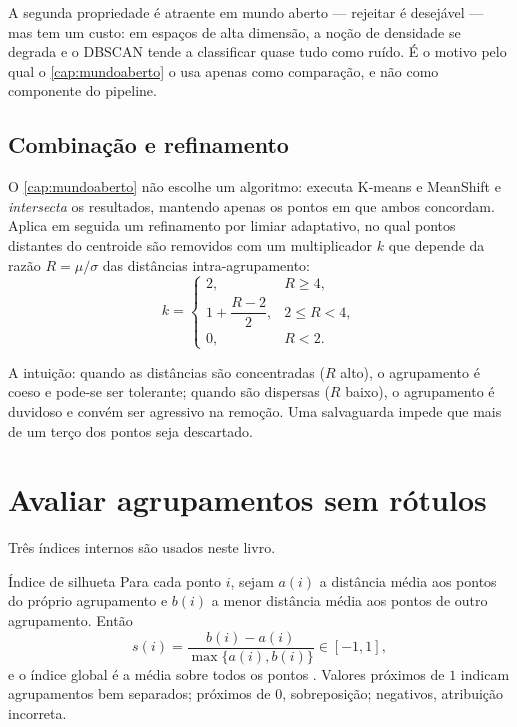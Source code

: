 A segunda propriedade é atraente em mundo aberto --- rejeitar é desejável --- mas tem um
custo: em espaços de alta dimensão, a noção de densidade se degrada e o DBSCAN tende a
classificar quase tudo como ruído. É o motivo pelo qual o \cref{cap:mundoaberto} o usa
apenas como comparação, e não como componente do pipeline.

\subsection{Combinação e refinamento}

O \cref{cap:mundoaberto} não escolhe um algoritmo: executa K-means e MeanShift e
\emph{intersecta} os resultados, mantendo apenas os pontos em que ambos concordam.
Aplica em seguida um refinamento por limiar adaptativo, no qual pontos distantes do
centroide são removidos com um multiplicador $k$ que depende da razão
$R = \mu/\sigma$ das distâncias intra-agrupamento:
\begin{equation}
  k = \begin{cases}
    2, & R \ge 4, \\
    1 + \dfrac{R - 2}{2}, & 2 \le R < 4, \\
    0, & R < 2.
  \end{cases}
  \label{eq:limiar-adaptativo}
\end{equation}

A intuição: quando as distâncias são concentradas ($R$ alto), o agrupamento é coeso e
pode-se ser tolerante; quando são dispersas ($R$ baixo), o agrupamento é duvidoso e
convém ser agressivo na remoção. Uma salvaguarda impede que mais de um terço dos pontos
seja descartado.

\section{Avaliar agrupamentos sem rótulos}

Três índices internos são usados neste livro.

\begin{definicao}{Índice de silhueta}
Para cada ponto $i$, sejam $a(i)$ a distância média aos pontos do próprio agrupamento e
$b(i)$ a menor distância média aos pontos de outro agrupamento. Então
\begin{equation}
  s(i) = \frac{b(i) - a(i)}{\max\{a(i), b(i)\}} \in [-1, 1],
  \label{eq:silhueta}
\end{equation}
e o índice global é a média sobre todos os pontos \citep{Rousseeuw1987}. Valores
próximos de $1$ indicam agrupamentos bem separados; próximos de $0$, sobreposição;
negativos, atribuição incorreta.
\end{definicao}

